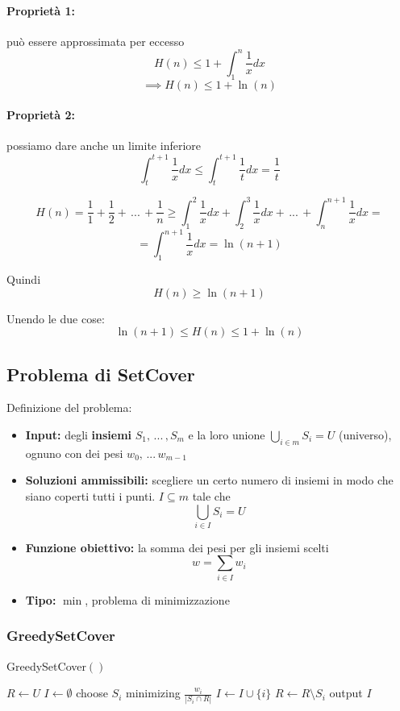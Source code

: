 \paragraph{Proprietà 1:}  può essere approssimata per eccesso
$$ H(n) \leq 1 + \int_1^n \frac{1}{x} dx$$
$$ \implies H(n) \leq 1 + \ln (n) $$

\paragraph{Proprietà 2:} possiamo dare anche un limite inferiore
$$ \int_t^{t+1} \frac{1}{x} dx \leq \int_t^{t+1} \frac{1}{t} dx = \frac{1}{t} $$

$$ H(n) = \frac{1}{1} + \frac{1}{2} + \, ... \, + \frac{1}{n} \geq \int_{1}^{2} \frac{1}{x} dx + \int_{2}^{3} \frac{1}{x} dx + \, ... \, + \int_{n}^{n+1} \frac{1}{x} dx =$$
$$ = \int_1^{n+1} \frac{1}{x} dx = \ln(n+1)$$

Quindi 
$$ H(n) \geq \ln(n+1) $$

Unendo le due cose:
$$ \ln (n+1) \leq H(n) \leq 1 + \ln(n) $$

\newpage

\subsection{Problema di SetCover}
Definizione del problema:
\begin{itemize}
	\item \textbf{Input:} degli \textbf{insiemi} $S_1, \, ... \, , S_m$ e la loro unione $\bigcup_{i \in m} S_i = U$ (universo), ognuno con dei pesi $w_0, \, ... \, w_{m-1}$
	
	\item \textbf{Soluzioni ammissibili:} scegliere un certo numero di insiemi in modo che siano coperti tutti i punti. $I \subseteq m$ tale che
	$$ \bigcup_{i \in I} S_i = U $$
	
	\item \textbf{Funzione obiettivo:} la somma dei pesi per gli insiemi scelti
	$$ w = \sum_{i \in I} w_i $$
	
	\item \textbf{Tipo:} $\min$, problema di minimizzazione
\end{itemize}

\subsubsection{GreedySetCover}
\begin{algorithm}
	\caption{GreedySetCover$()$}
	\begin{algorithmic}
		\STATE $R \leftarrow U$
		\STATE $I \leftarrow \emptyset$
		\STATE choose $S_i$ minimizing $\frac{w_i}{|S_i \cap R|}$
		\STATE $I \leftarrow I \cup \{i\}$
		\STATE $R \leftarrow R \setminus S_i$
		\ENDWHILE
		\STATE output $I$
	\end{algorithmic}
\end{algorithm}

